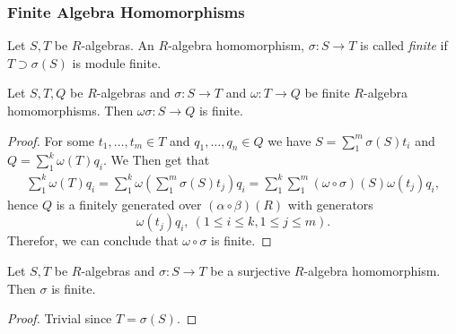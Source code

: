 \subsubsection{Finite Algebra Homomorphisms}
    \begin{definition}
        Let $S,T$ be $R$-algebras. An $R$-algebra homomorphism, $\sigma: S\rightarrow T$ is called \textit{finite} if $T\supset \sigma(S)$ is module finite.   
    \end{definition}
    \begin{lemma}\label{CompositionOfFiniteAlgebraHomsIsFinite}
        Let $S,T,Q$ be $R$-algebras and $\sigma: S\rightarrow T$ and $\omega: T\rightarrow Q$ be finite $R$-algebra homomorphisms. Then $\omega\sigma : S\rightarrow Q$ is finite. 
    \end{lemma}
    \begin{proof}
        For some  $t_1,\dots,t_m\in T$ and $q_1,\dots,q_n\in Q$  we have $S=\sum_1^m \sigma(S)t_i$ and $Q=\sum_1^k \omega(T)q_i$. We Then get that 
        \begin{align*}
            \sum_1^k \omega(T)q_i = \sum_1^k \omega\left(\sum_1^m \sigma(S)t_j\right)q_i =\sum_1^k\sum_1^m (\omega\circ\sigma)\left(S\right)\omega(t_j)q_i,  
        \end{align*}
        hence $Q$ is a finitely generated over $(\alpha\circ \beta)(R)$ with generators 
        $$\omega(t_j)q_i,\ (1\leq i\leq k, 1\leq j\leq m).$$
        Therefor, we can conclude that $\omega\circ \sigma$ is finite. 
    \end{proof}
    \begin{lemma}\label{SurjectiveAlgebraHomomorphismIsFinite}
        Let $S,T$ be $R$-algebras and $\sigma : S\rightarrow T$ be a surjective $R$-algebra homomorphism. Then $\sigma$ is finite. 
    \end{lemma}
    \begin{proof}
        Trivial since $T = \sigma(S)$.
    \end{proof}
